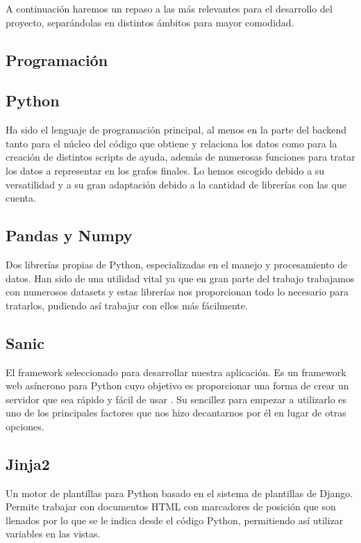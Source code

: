 A continuación haremos un repaso a las más relevantes para el desarrollo del proyecto, separándolas en distintos ámbitos para mayor comodidad.\\

\subsection{Programación}

\subsection*{Python}

Ha sido el lenguaje de programación principal, al menos en la parte del backend tanto para el núcleo del código que obtiene y relaciona los datos como para la creación de distintos scripts de ayuda, además de numerosas funciones para tratar los datos a representar en los grafos finales. Lo hemos escogido debido a su versatilidad y a su gran adaptación debido a la cantidad de librerías con las que cuenta.

\subsection*{Pandas y Numpy}

Dos librerías propias de Python, especializadas en el manejo y procesamiento de datos. Han sido de una utilidad vital ya que en gran parte del trabajo trabajamos con numerosos datasets y estas librerías nos proporcionan todo lo necesario para tratarlos, pudiendo así trabajar con ellos más fácilmente.

\subsection*{Sanic}

El framework seleccionado para desarrollar nuestra aplicación. Es un framework web asíncrono para Python cuyo objetivo es proporcionar una forma de crear un servidor que sea rápido y fácil de usar \cite{sanic}. Su sencillez para empezar a utilizarlo es uno de los principales factores que nos hizo decantarnos por él en lugar de otras opciones.

\subsection*{Jinja2}

Un motor de plantillas para Python basado en el sistema de plantillas de Django. Permite trabajar con documentos HTML con marcadores de posición que son llenados por lo que se le indica desde el código Python, permitiendo así utilizar variables en las vistas.\\

